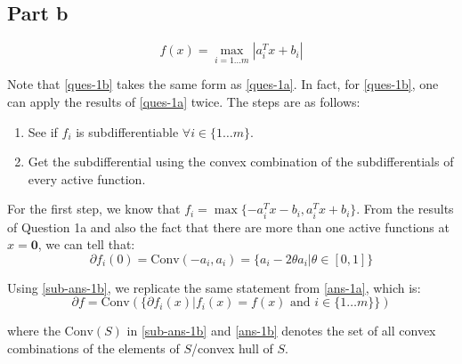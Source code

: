 \documentclass[11pt]{article}
\begin{document}
\subsection*{Part b}
\begin{flushleft}
\begin{equation}
\label{ques-1b}
\displaystyle f(x) = \max_{i=1\ldots m} |a_{i}^{T}x + b_{i}|
\end{equation}

Note that \ref{ques-1b} takes the same form as \ref{ques-1a}. In fact, for \ref{ques-1b}, one can apply the results of \ref{ques-1a} twice. 
The steps are as follows:
\begin{enumerate}
\item See if \(f_{i}\) is subdifferentiable \(\forall i \in \{1 \ldots m\}\).
\item Get the subdifferential using the convex combination of the subdifferentials of every active function.
\end{enumerate}

For the first step, we know that \(\displaystyle f_{i} = \max \{-a_{i}^{T}x - b_{i}, a_{i}^Tx + b_{i}\}\). From the results of Question 1a and also the fact that there are more than one active functions at \(x = \mathbf{0}\), we can tell that:
\begin{equation}
\label{sub-ans-1b}
\partial f_{i}(0) = \text{Conv}(-a_{i}, a_{i}) = \{a_{i} - 2\theta a_{i} | \theta \in [0, 1]\}
\end{equation}

Using \ref{sub-ans-1b}, we replicate the same statement from \ref{ans-1a}, which is:
\begin{equation}
\label{ans-1b}
\partial f = \text{Conv}\left(\{\partial f_{i}(x) | f_{i}(x) = f(x) \text{ and } i \in \{1 \ldots m\}\}\right)
\end{equation}

where the \(\text{Conv}(S)\) in \ref{sub-ans-1b} and \ref{ans-1b} denotes the set of all convex combinations of the elements of \(S\)/convex hull of \(S\).
\end{flushleft}
\end{document}
